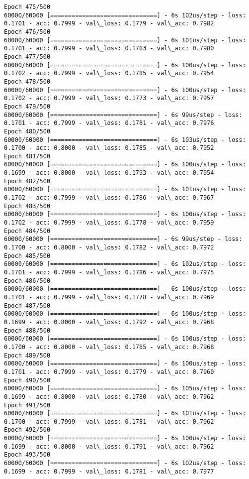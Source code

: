 \documentclass[11pt]{article}
\begin{document}
\begin{Verbatim}[commandchars=\\\{\}]
Epoch 475/500
60000/60000 [==============================] - 6s 102us/step - loss: 0.1701 - acc: 0.7999 - val\_loss: 0.1779 - val\_acc: 0.7982
Epoch 476/500
60000/60000 [==============================] - 6s 101us/step - loss: 0.1701 - acc: 0.7999 - val\_loss: 0.1783 - val\_acc: 0.7980
Epoch 477/500
60000/60000 [==============================] - 6s 100us/step - loss: 0.1702 - acc: 0.7999 - val\_loss: 0.1785 - val\_acc: 0.7954
Epoch 478/500
60000/60000 [==============================] - 6s 100us/step - loss: 0.1702 - acc: 0.7999 - val\_loss: 0.1773 - val\_acc: 0.7957
Epoch 479/500
60000/60000 [==============================] - 6s 99us/step - loss: 0.1701 - acc: 0.7999 - val\_loss: 0.1781 - val\_acc: 0.7976
Epoch 480/500
60000/60000 [==============================] - 6s 103us/step - loss: 0.1700 - acc: 0.8000 - val\_loss: 0.1785 - val\_acc: 0.7952
Epoch 481/500
60000/60000 [==============================] - 6s 100us/step - loss: 0.1699 - acc: 0.8000 - val\_loss: 0.1793 - val\_acc: 0.7954
Epoch 482/500
60000/60000 [==============================] - 6s 101us/step - loss: 0.1702 - acc: 0.7999 - val\_loss: 0.1786 - val\_acc: 0.7967
Epoch 483/500
60000/60000 [==============================] - 6s 100us/step - loss: 0.1702 - acc: 0.7999 - val\_loss: 0.1778 - val\_acc: 0.7959
Epoch 484/500
60000/60000 [==============================] - 6s 99us/step - loss: 0.1700 - acc: 0.8000 - val\_loss: 0.1782 - val\_acc: 0.7972
Epoch 485/500
60000/60000 [==============================] - 6s 102us/step - loss: 0.1701 - acc: 0.7999 - val\_loss: 0.1786 - val\_acc: 0.7975
Epoch 486/500
60000/60000 [==============================] - 6s 100us/step - loss: 0.1701 - acc: 0.7999 - val\_loss: 0.1778 - val\_acc: 0.7969
Epoch 487/500
60000/60000 [==============================] - 6s 100us/step - loss: 0.1699 - acc: 0.8000 - val\_loss: 0.1792 - val\_acc: 0.7968
Epoch 488/500
60000/60000 [==============================] - 6s 100us/step - loss: 0.1700 - acc: 0.8000 - val\_loss: 0.1785 - val\_acc: 0.7968
Epoch 489/500
60000/60000 [==============================] - 6s 100us/step - loss: 0.1701 - acc: 0.7999 - val\_loss: 0.1779 - val\_acc: 0.7960
Epoch 490/500
60000/60000 [==============================] - 6s 105us/step - loss: 0.1699 - acc: 0.8000 - val\_loss: 0.1780 - val\_acc: 0.7962
Epoch 491/500
60000/60000 [==============================] - 6s 101us/step - loss: 0.1700 - acc: 0.7999 - val\_loss: 0.1781 - val\_acc: 0.7962
Epoch 492/500
60000/60000 [==============================] - 6s 100us/step - loss: 0.1699 - acc: 0.8000 - val\_loss: 0.1791 - val\_acc: 0.7962
Epoch 493/500
60000/60000 [==============================] - 6s 102us/step - loss: 0.1699 - acc: 0.7999 - val\_loss: 0.1781 - val\_acc: 0.7977

\end{Verbatim}
\end{document}
